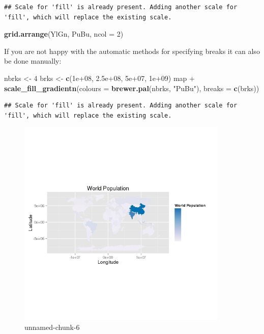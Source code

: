 \documentclass[]{article}
\newenvironment{Shaded}{}{}
\newcommand{\KeywordTok}[1]{\textcolor[rgb]{0.00,0.44,0.13}{\textbf{{#1}}}}
\newcommand{\DataTypeTok}[1]{\textcolor[rgb]{0.56,0.13,0.00}{{#1}}}
\newcommand{\DecValTok}[1]{\textcolor[rgb]{0.25,0.63,0.44}{{#1}}}
\newcommand{\FloatTok}[1]{\textcolor[rgb]{0.25,0.63,0.44}{{#1}}}
\newcommand{\StringTok}[1]{\textcolor[rgb]{0.25,0.44,0.63}{{#1}}}
\newcommand{\NormalTok}[1]{{#1}}
\let\Oldincludegraphics\includegraphics
\renewcommand{\includegraphics}[1]{\Oldincludegraphics[width=10cm]{#1}}
\begin{document}
\begin{verbatim}
## Scale for 'fill' is already present. Adding another scale for 'fill', which will replace the existing scale.
\end{verbatim}

\begin{Shaded}
\begin{Highlighting}[]

\KeywordTok{grid.arrange}\NormalTok{(YlGn, PuBu, }\DataTypeTok{ncol =} \DecValTok{2}\NormalTok{)}
\end{Highlighting}
\end{Shaded}

If you are not happy with the automatic methods for specifying breaks it
can also be done manually:

\begin{Shaded}
\begin{Highlighting}[]
\NormalTok{nbrks <- }\DecValTok{4}
\NormalTok{brks <- }\KeywordTok{c}\NormalTok{(}\FloatTok{1e+08}\NormalTok{, }\FloatTok{2.5e+08}\NormalTok{, }\FloatTok{5e+07}\NormalTok{, }\FloatTok{1e+09}\NormalTok{)}
\NormalTok{map + }\KeywordTok{scale_fill_gradientn}\NormalTok{(}\DataTypeTok{colours =} \KeywordTok{brewer.pal}\NormalTok{(nbrks, }\StringTok{"PuBu"}\NormalTok{), }\DataTypeTok{breaks =} \KeywordTok{c}\NormalTok{(brks))}
\end{Highlighting}
\end{Shaded}

\begin{verbatim}
## Scale for 'fill' is already present. Adding another scale for 'fill', which will replace the existing scale.
\end{verbatim}

\begin{figure}[htbp]
\centering
\includegraphics{figure/unnamed-chunk-6.png}
\caption{unnamed-chunk-6}
\end{figure}
\end{document}
